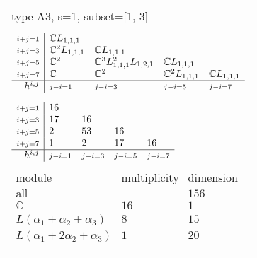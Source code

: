 \documentclass[crop,border=2mm]{standalone}
\begin{document}
\begin{tabular}{l}
{\huge type A3, s=1, subset=[1, 3]}\\ \\


$\displaystyle
\begin{array}{r|l l l l}
	{\scriptstyle i+j=1}&\mathbb{C}L_{1,1,1}&&&\\
	{\scriptstyle i+j=3}&\mathbb{C}^{2}L_{1,1,1}&\mathbb{C}L_{1,1,1}&&\\
	{\scriptstyle i+j=5}&\mathbb{C}^{2}&\mathbb{C}^{3}L_{1,1,1}^{2}L_{1,2,1}&\mathbb{C}L_{1,1,1}&\\
	{\scriptstyle i+j=7}&\mathbb{C}&\mathbb{C}^{2}&\mathbb{C}^{2}L_{1,1,1}&\mathbb{C}L_{1,1,1}\\
	\hline h^{i,j}&{\scriptstyle j-i=1}&{\scriptstyle j-i=3}&{\scriptstyle j-i=5}&{\scriptstyle j-i=7}
\end{array}
$ \\ \\


$\displaystyle
\begin{array}{r|l l l l}
	{\scriptstyle i+j=1}&16&&&\\
	{\scriptstyle i+j=3}&17&16&&\\
	{\scriptstyle i+j=5}&2&53&16&\\
	{\scriptstyle i+j=7}&1&2&17&16\\
	\hline h^{i,j}&{\scriptstyle j-i=1}&{\scriptstyle j-i=3}&{\scriptstyle j-i=5}&{\scriptstyle j-i=7}
\end{array}
$ \\ \\


$\displaystyle
\begin{array}{rll}
	\text{module}&\text{multiplicity}&\text{dimension} \\ \hline \text{all}&&156 \\
	\mathbb{C}&16&1\\
	L\left(\alpha_{1}+\alpha_{2}+\alpha_{3}\right)&8&15\\
	L\left(\alpha_{1}+ 2\alpha_{2}+\alpha_{3}\right)&1&20
\end{array}
$ \\ \\

\end{tabular}
\end{document}
